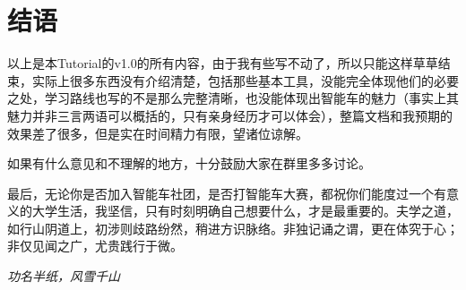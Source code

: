 \documentclass[a4paper,12pt]{article}
\begin{document}
\section{结语}

以上是本Tutorial的v1.0的所有内容，由于我有些写不动了，所以只能这样草草结束，实际上很多东西没有介绍清楚，包括那些基本工具，没能完全体现他们的必要之处，学习路线也写的不是那么完整清晰，也没能体现出智能车的魅力（事实上其魅力并非三言两语可以概括的，只有亲身经历才可以体会），整篇文档和我预期的效果差了很多，但是实在时间精力有限，望诸位谅解。

如果有什么意见和不理解的地方，十分鼓励大家在群里多多讨论。

最后，无论你是否加入智能车社团，是否打智能车大赛，都祝你们能度过一个有意义的大学生活，我坚信，只有时刻明确自己想要什么，才是最重要的。夫学之道，如行山阴道上，初涉则歧路纷然，稍进方识脉络。非独记诵之谓，更在体究于心；非仅见闻之广，尤贵践行于微。

\vspace{2cm}
\begin{center}
\textit{功名半纸，风雪千山}
\end{center}
\end{document}
